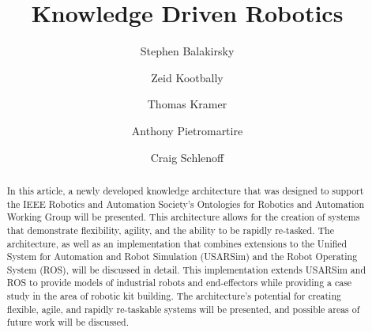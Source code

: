\documentclass[preprint,12pt]{elsarticle}
\begin{document}
\begin{frontmatter}



\title{Knowledge Driven Robotics}


\author[NIST]{Stephen Balakirsky}
\author[NIST,UMD]{Zeid Kootbally}
\author[CATHU,NIST]{Thomas Kramer}
\author[NIST]{Anthony Pietromartire}
\author[NIST]{Craig Schlenoff}

\address[CATHU]{Catholic University of America, Washington, DC, USA}
\address[NIST]{National Institute of Standards and Technology, Gaithersburg, MD USA}
\address[UMD]{University of Maryland, College Park, MD, USA}

\begin{abstract}
In this article,  a newly developed knowledge architecture that was designed to support the IEEE Robotics and Automation Society's Ontologies for Robotics and Automation Working Group
will be presented. This architecture allows for the creation of systems that demonstrate flexibility, agility, and the ability to be rapidly re-tasked. The architecture, as well as
an implementation that combines extensions to the Unified System for Automation and Robot Simulation (USARSim) and the Robot Operating System (ROS), will be discussed
in detail. This implementation extends USARSim and ROS to provide models of industrial robots and end-effectors while providing a case study in the area of robotic kit building.
The architecture's potential for creating flexible, agile, and rapidly re-taskable systems will be presented, and possible areas of future work will be discussed.
\end{abstract}

\begin{keyword}


\end{keyword}

\end{frontmatter}
\end{document}
